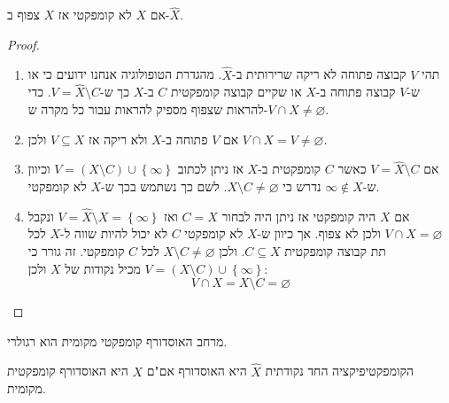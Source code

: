 \documentclass{tstextbook}
\begin{document}
\begin{proposition}
אם \(X\) לא קומפקטי אז \(X\) צפוף ב-\(\hat{X}\).

\end{proposition}
\begin{proof}
  \begin{enumerate}
    \item תהי \(V\) קבוצה פתוחה לא ריקה שרירותית ב-\(\hat{X}\). מהגדרת הטופולוגיה אנחנו ידועים כי או ש-\(V\) קבוצה פתוחה ב-\(X\) או שקיים קבוצה קומפקטית \(C\) ב-\(X\) כך ש-\(V=\hat{X}\setminus C\). כדי להראות שצפוף מספיק להראות עבור כל מקרה ש-\(V\cap X\neq \varnothing\). 


    \item אם \(V\) פתוחה ב-\(X\) ולא ריקה אז \(V\subseteq X\) ולכן \(V\cap X=V\neq \varnothing\). 


    \item אם \(V=\hat{X} \setminus C\) כאשר \(C\) קומפקטית ב-\(X\) אז ניתן לכתוב \(V=\left( X\setminus C \right)\cup \left\{  \infty  \right\}\) וכיוון ש-\(\infty \not \in X\) נדרש כי \(X \setminus C \neq \varnothing\). לשם כך נשתמש בכך ש-\(X\) לא קומפקטי. 


    \item אם \(X\) היה קומפקטי אז ניתן היה לבחור \(C=X\) ואז \(V=\hat{X} \setminus X=\left\{  \infty  \right\}\) ונקבל \(V\cap X=\varnothing\) ולכן לא צפוף. אך כיוון ש-\(X\) לא קומפקטי \(C\) לא יכול להיות שווה ל-\(X\) לכל תת קבוצה קומפקטית \(C\subseteq X\). ולכן \(X\setminus C\neq \varnothing\) לכל \(C\) קומפקטי. זה גורר כי \(V=\left( X\setminus  C \right)\cup \left\{  \infty  \right\}\) מכיל נקודות של \(X\) ולכן: 
$$V\cap X= X \setminus  C=\varnothing $$


  \end{enumerate}
\end{proof}
\begin{lemma}
מרחב האוסדורף קומפקטי מקומית הוא רגולרי.

\end{lemma}
\begin{proposition}
הקומפקטיפיקציה החד נקודתית \(\hat{X}\) היא האוסדורף אם"ם \(X\) היא האוסדורף קומפקטית מקומית.

\end{proposition}
\end{document}
